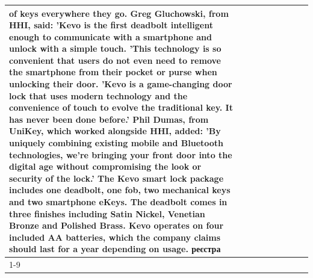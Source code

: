 \begin{table}[H]
\begin{tabular}{lllrlllll}
of keys everywhere they go. Greg Gluchowski, from HHI, said: 'Kevo is the first deadbolt intelligent enough to communicate with a smartphone and unlock with a simple touch. 'This technology is so convenient that users do not even need to remove the smartphone from their pocket or purse when unlocking their door. 'Kevo is a game-changing door lock that uses modern technology and the convenience of touch to evolve the traditional key. It has never been done before.' Phil Dumas, from UniKey, which worked alongside HHI, added: 'By uniquely combining existing mobile and Bluetooth technologies, we’re bringing your front door into the digital age without compromising the look or security of the lock.' The Kevo smart lock package includes one deadbolt, one fob, two mechanical keys and two smartphone eKeys. The deadbolt comes in three finishes including Satin Nickel, Venetian Bronze and Polished Brass. Kevo operates on four included AA batteries, which the company claims should last for a year depending on usage. реєстра \\
\cline{1-9}

\end{tabular}
\end{table}
